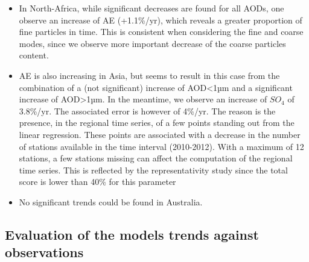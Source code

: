 \documentclass[journal abbreviation, manuscript]{copernicus}
\begin{document}
\begin{itemize}
 \item In North-Africa, while significant decreases are found for all AODs, one observe an increase of AE (+1.1\%/yr), which reveals a greater proportion of fine particles in time. This is consistent when considering the fine and coarse modes, since we observe more important decrease of the coarse particles content.
 \item AE is also increasing in Asia, but seems to result in this case from the combination of a (not significant) increase of AOD<1µm and a significant increase of AOD>1µm. In the meantime, we observe an increase of $SO_{4}$ of 3.8\%/yr. The associated error is however of 4\%/yr. The reason is the presence, in the regional time series, of a few points standing out from the linear regression. These points are associated with a decrease in the number of stations available in the time interval (2010-2012). With a maximum of 12 stations, a few stations missing can affect the computation of the regional time series. This is reflected by the representativity study since the total score is lower than 40\% for this parameter
 \item No significant trends could be found in Australia.

\end{itemize}

\subsection{Evaluation of the models trends against observations}
\end{document}
